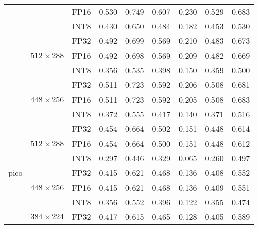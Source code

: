 \begin{appendices}
\begin{table}[H]
\begin{tabular}{|c|c|c|rrrrrr|}
                                    &                                  & FP16 & 0.530 & 0.749 & 0.607 & 0.230 & 0.529 & 0.683 \\
                                    &                                  & INT8 & 0.430 & 0.650 & 0.484 & 0.182 & 0.453 & 0.530 \\
        \cline{2-9}
                                    & \multirow{3}{*}{$512\times288$}  & FP32 & 0.492 & 0.699 & 0.569 & 0.210 & 0.483 & 0.673 \\
                                    &                                  & FP16 & 0.492 & 0.698 & 0.569 & 0.209 & 0.482 & 0.669 \\
                                    &                                  & INT8 & 0.356 & 0.535 & 0.398 & 0.150 & 0.359 & 0.500 \\
        \cline{2-9}
                                    & \multirow{3}{*}{$448\times256$}  & FP32 & 0.511 & 0.723 & 0.592 & 0.206 & 0.508 & 0.681 \\
                                    &                                  & FP16 & 0.511 & 0.723 & 0.592 & 0.205 & 0.508 & 0.683 \\
                                    &                                  & INT8 & 0.372 & 0.555 & 0.417 & 0.140 & 0.371 & 0.516 \\
        \hline
        \multirow{9}{*}{pico}        & \multirow{3}{*}{$512\times288$}  & FP32 & 0.454 & 0.664 & 0.502 & 0.151 & 0.448 & 0.614 \\
                                    &                                  & FP16 & 0.454 & 0.664 & 0.500 & 0.151 & 0.448 & 0.612 \\
                                    &                                  & INT8 & 0.297 & 0.446 & 0.329 & 0.065 & 0.260 & 0.497 \\
        \cline{2-9}
                                    & \multirow{3}{*}{$448\times256$}  & FP32 & 0.415 & 0.621 & 0.468 & 0.136 & 0.408 & 0.552 \\
                                    &                                  & FP16 & 0.415 & 0.621 & 0.468 & 0.136 & 0.409 & 0.551 \\
                                    &                                  & INT8 & 0.356 & 0.552 & 0.396 & 0.122 & 0.355 & 0.474 \\
        \cline{2-9}
                                    & \multirow{3}{*}{$384\times224$}  & FP32 & 0.417 & 0.615 & 0.465 & 0.128 & 0.405 & 0.589 \\

\end{tabular}
\end{table}
\end{appendices}
